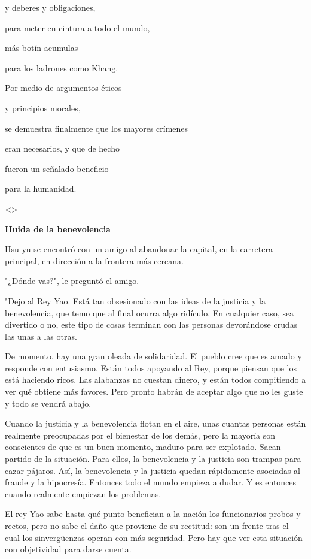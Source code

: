 y deberes y obligaciones,

para meter en cintura a todo el mundo,

más botín acumulas

para los ladrones como Khang.

Por medio de argumentos éticos

y principios morales,

se demuestra finalmente que los mayores crímenes

eran necesarios, y que de hecho

fueron un señalado beneficio

para la humanidad.

\textless\textgreater{}

\textbf{{Huida de la benevolencia}}

Hsu yu se encontró con un amigo al abandonar la capital, en la carretera
principal, en dirección a la frontera más cercana.

"¿Dónde vas?", le preguntó el amigo.

"Dejo al Rey Yao. Está tan obsesionado con las ideas de la justicia y la
benevolencia, que temo que al final ocurra algo ridículo. En cualquier
caso, sea divertido o no, este tipo de cosas terminan con las personas
devorándose crudas las unas a las otras.

De momento, hay una gran oleada de solidaridad. El pueblo cree que es
amado y responde con entusiasmo. Están todos apoyando al Rey, porque
piensan que los está haciendo ricos. Las alabanzas no cuestan dinero, y
están todos compitiendo a ver qué obtiene más favores. Pero pronto
habrán de aceptar algo que no les guste y todo se vendrá abajo.

Cuando la justicia y la benevolencia flotan en el aire, unas cuantas
personas están realmente preocupadas por el bienestar de los demás, pero
la mayoría son conscientes de que es un buen momento, maduro para ser
explotado. Sacan partido de la situación. Para ellos, la benevolencia y
la justicia son trampas para cazar pájaros. Así, la benevolencia y la
justicia quedan rápidamente asociadas al fraude y la hipocresía.
Entonces todo el mundo empieza a dudar. Y es entonces cuando realmente
empiezan los problemas.

El rey Yao sabe hasta qué punto benefician a la nación los funcionarios
probos y rectos, pero no sabe el daño que proviene de su rectitud: son
un frente tras el cual los sinvergüenzas operan con más seguridad. Pero
hay que ver esta situación con objetividad para darse cuenta.

